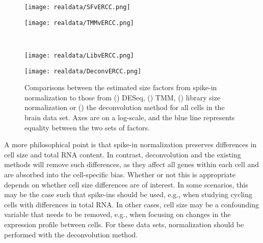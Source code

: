 \documentclass{article}
\begin{document}
\begin{figure}[btp]
\begin{center}
    \begin{minipage}{0.33\textwidth}
        \texttt{[image: realdata/SFvERCC.png]}
        \subcaption{}\label{subfig:spike_sf}
    \end{minipage}
    \begin{minipage}{0.33\textwidth}
        \texttt{[image: realdata/TMMvERCC.png]}
        \subcaption{}\label{subfig:spike_tmm}
    \end{minipage} \\ 
    \begin{minipage}{0.33\textwidth}
        \texttt{[image: realdata/LibvERCC.png]}
        \subcaption{}\label{subfig:spike_lib}
    \end{minipage} 
    \begin{minipage}{0.33\textwidth}
        \texttt{[image: realdata/DeconvERCC.png]}
        \subcaption{}\label{subfig:spike_sum}
    \end{minipage}
\end{center}
    \caption{
        Comparisons between the estimated size factors from spike-in normalization to those from () DESeq, () TMM,
            () library size normalization or () the deconvolution method for all cells in the brain data set.                  
        Axes are on a log-scale, and the blue line represents equality between the two sets of factors.
    }
    \label{fig:real_spike}  
\end{figure}

A more philosophical point is that spike-in normalization preserves differences in cell size and total RNA content.
In contrast, deconvolution and the existing methods will remove such differences, as they affect all genes within each cell and are absorbed into the cell-specific bias.
Whether or not this is appropriate depends on whether cell size differences are of interest.
In some scenarios, this may be the case such that spike-ins should be used, e.g., when studying cycling cells with differences in total RNA.
In other cases, cell size may be a confounding variable that needs to be removed, e.g., when focusing on changes in the expression profile between cells.
For these data sets, normalization should be performed with the deconvolution method.
\end{document}

